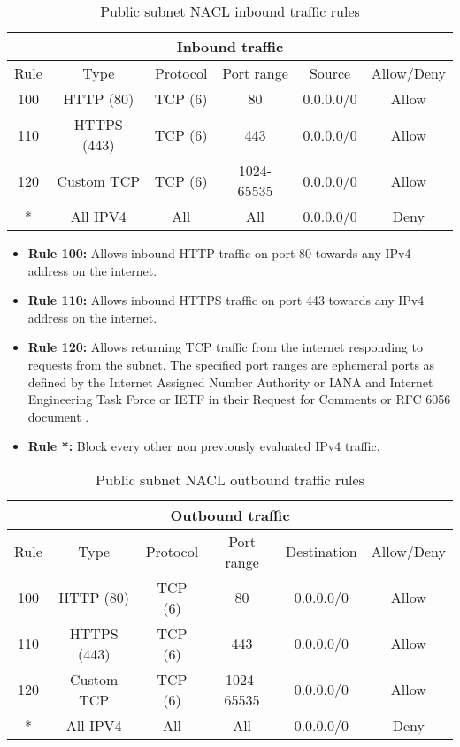 \begin{table}[H]
    \centering
    \begin{tabular}{|c|c|c|c|c|c|}
        \hline
        \multicolumn{6}{|c|}{Inbound traffic}                               \\
        \hline
        Rule & Type        & Protocol & Port range & Source    & Allow/Deny \\
        \hline
        100  & HTTP (80)   & TCP (6)  & 80         & 0.0.0.0/0 & Allow      \\
        \hline
        110  & HTTPS (443) & TCP (6)  & 443        & 0.0.0.0/0 & Allow      \\
        \hline
        120  & Custom TCP  & TCP (6)  & 1024-65535 & 0.0.0.0/0 & Allow      \\
        \hline
        *    & All IPV4    & All      & All        & 0.0.0.0/0 & Deny       \\
        \hline
    \end{tabular}
    \caption{Public subnet NACL inbound traffic rules}
    \label{table:public-subnet-inbound}
\end{table}

\begin{itemize}
    \item \textbf{Rule 100:} Allows inbound HTTP traffic on port 80 towards any IPv4 address on the internet.
    \item \textbf{Rule 110:} Allows inbound HTTPS traffic on port 443 towards any IPv4 address on the internet.
    \item \textbf{Rule 120:} Allows returning TCP traffic from the internet responding to requests from the subnet. The specified port ranges are ephemeral ports as defined by the Internet Assigned Number Authority or IANA and Internet Engineering Task Force or IETF in their Request for Comments or RFC 6056 document \cite{rfc6056}.
    \item \textbf{Rule *:} Block every other non previously evaluated IPv4 traffic.
\end{itemize}

\begin{table}[H]
    \centering
    \begin{tabular}{|c|c|c|c|c|c|}
        \hline
        \multicolumn{6}{|c|}{Outbound traffic}                                \\
        \hline
        Rule & Type        & Protocol & Port range & Destination & Allow/Deny \\
        \hline
        100  & HTTP (80)   & TCP (6)  & 80         & 0.0.0.0/0   & Allow      \\
        \hline
        110  & HTTPS (443) & TCP (6)  & 443        & 0.0.0.0/0   & Allow      \\
        \hline
        120  & Custom TCP  & TCP (6)  & 1024-65535 & 0.0.0.0/0   & Allow      \\
        \hline
        *    & All IPV4    & All      & All        & 0.0.0.0/0   & Deny       \\
        \hline
    \end{tabular}
    \caption{Public subnet NACL outbound traffic rules}
    \label{table:public-subnet-outbound}
\end{table}

